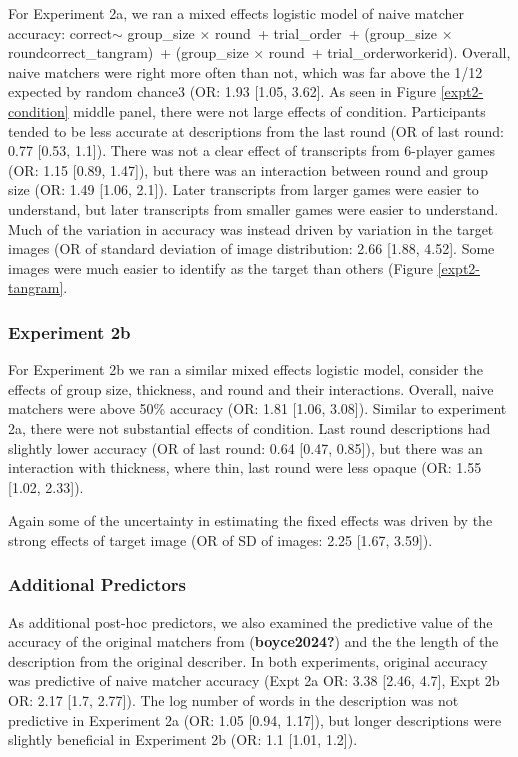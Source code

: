 \documentclass[10pt, letterpaper]{article}
\begin{document}
For Experiment 2a, we ran a mixed effects logistic model of naive
matcher accuracy: correct\(\sim\) group\_size \(\times\) round~+
trial\_order~+ (group\_size \(\times\) round\textbar correct\_tangram)~+
(group\_size \(\times\) round~+ trial\_order\textbar workerid). Overall,
naive matchers were right more often than not, which was far above the
1/12 expected by random chance3 (OR: 1.93 {[}1.05, 3.62{]}. As seen in
Figure \ref{expt2-condition} middle panel, there were not large effects
of condition. Participants tended to be less accurate at descriptions
from the last round (OR of last round: 0.77 {[}0.53, 1.1{]}). There was
not a clear effect of transcripts from 6-player games (OR: 1.15 {[}0.89,
1.47{]}), but there was an interaction between round and group size (OR:
1.49 {[}1.06, 2.1{]}). Later transcripts from larger games were easier
to understand, but later transcripts from smaller games were easier to
understand. Much of the variation in accuracy was instead driven by
variation in the target images (OR of standard deviation of image
distribution: 2.66 {[}1.88, 4.52{]}. Some images were much easier to
identify as the target than others (Figure \ref{expt2-tangram}.

\subsubsection{Experiment 2b}\label{experiment-2b-1}

For Experiment 2b we ran a similar mixed effects logistic model,
consider the effects of group size, thickness, and round and their
interactions. Overall, naive matchers were above 50\% accuracy (OR: 1.81
{[}1.06, 3.08{]}). Similar to experiment 2a, there were not substantial
effects of condition. Last round descriptions had slightly lower
accuracy (OR of last round: 0.64 {[}0.47, 0.85{]}), but there was an
interaction with thickness, where thin, last round were less opaque (OR:
1.55 {[}1.02, 2.33{]}).

Again some of the uncertainty in estimating the fixed effects was driven
by the strong effects of target image (OR of SD of images: 2.25 {[}1.67,
3.59{]}).

\subsubsection{Additional Predictors}\label{additional-predictors}

As additional post-hoc predictors, we also examined the predictive value
of the accuracy of the original matchers from (\textbf{boyce2024?}) and
the the length of the description from the original describer. In both
experiments, original accuracy was predictive of naive matcher accuracy
(Expt 2a OR: 3.38 {[}2.46, 4.7{]}, Expt 2b OR: 2.17 {[}1.7, 2.77{]}).
The log number of words in the description was not predictive in
Experiment 2a (OR: 1.05 {[}0.94, 1.17{]}), but longer descriptions were
slightly beneficial in Experiment 2b (OR: 1.1 {[}1.01, 1.2{]}).
\end{document}
